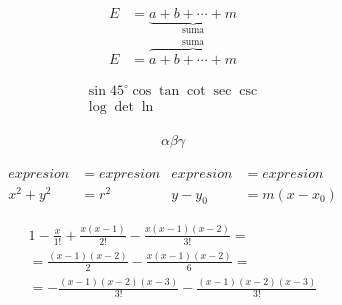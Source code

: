 \documentclass{article}
\begin{document}
\begin{align*}
  E &= \underbrace{a + b + \cdots + m}_{\text{suma}}\\
  E &= \overbrace{a + b + \cdots + m}^{\text{suma}}
\end{align*}

\begin{align*}
  \sin 45^{\circ} \cos   \tan   \cot   \sec   \csc \\
  \log \det \ln
\end{align*}

\begin{align*}
  \alpha \beta \gamma
\end{align*}



\begin{align*}
  expresion &= expresion    &   expresion &= expresion\\
  x^2 + y^2 &= r^2          &   y - y_0 &= m(x - x_0)
\end{align*}


\begin{multline*}
  1-\frac{x}{1 !}+\frac{x(x-1)}{2 !}-\frac{x(x-1)(x-2)}{3 !}= \\ 
  =\frac{(x-1)(x-2)}{2}-\frac{x(x-1)(x-2)}{6}=\\
  =-\frac{(x-1)(x-2)(x-3)}{3 !}-\frac{(x-1)(x-2)(x-3)}{3 !}
\end{multline*}
\end{document}
